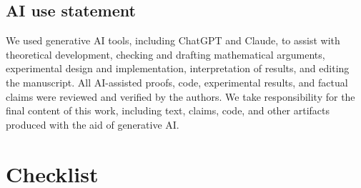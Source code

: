 \documentclass[twoside]{article}
\begin{document}


\subsection*{AI use statement}

We used generative AI tools, including ChatGPT and Claude, to assist with
theoretical development, checking and drafting mathematical arguments,
experimental design and implementation, interpretation of results, and
editing the manuscript. All AI-assisted proofs, code, experimental results,
and factual claims were reviewed and verified by the authors. We take
responsibility for the final content of this work, including text, claims,
code, and other artifacts produced with the aid of generative AI.





\section*{Checklist}
\end{document}
